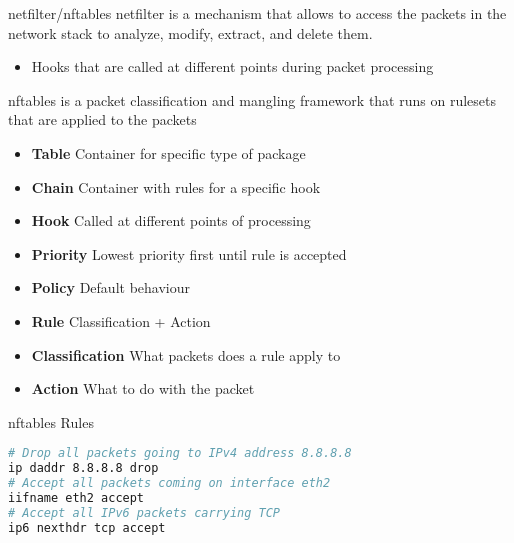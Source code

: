\begin{definition}{netfilter/nftables}
    netfilter is a mechanism that allows to access the packets in the network stack to analyze, modify, extract, and delete them.
    \begin{itemize}
        \item Hooks that are called at different points during packet processing
    \end{itemize}
    
    nftables is a packet classification and mangling framework that runs on rulesets that are applied to the packets
    \begin{itemize}
        \item \textbf{Table} Container for specific type of package
        \item \textbf{Chain} Container with rules for a specific hook
        \item \textbf{Hook} Called at different points of processing
        \item \textbf{Priority} Lowest priority first until rule is accepted
        \item \textbf{Policy} Default behaviour
        \item \textbf{Rule} Classification + Action
        \item \textbf{Classification} What packets does a rule apply to
        \item \textbf{Action} What to do with the packet
    \end{itemize}
\end{definition}





\begin{examplecode}{nftables Rules}
\begin{lstlisting}[language=bash, style=basesmolll]
# Drop all packets going to IPv4 address 8.8.8.8
ip daddr 8.8.8.8 drop
# Accept all packets coming on interface eth2
iifname eth2 accept
# Accept all IPv6 packets carrying TCP
ip6 nexthdr tcp accept
\end{lstlisting}
\end{examplecode}

\multend